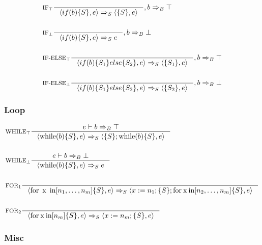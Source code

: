 \begin{align*}
&\inference[$\text{IF}_\top$]{}
                      {\Braket{if(b)\{S\},e} \Rightarrow_S \Braket{\{S\},e}}
											{,b \Rightarrow_B \top}
\\\\
&\inference[$\text{IF}_\bot$]{}
                      {\Braket{if(b)\{S\},e} \Rightarrow_S e}
											{,b \Rightarrow_B \bot}
\\\\
&\inference[$\text{IF-ELSE}_\top$]{}
                      {\Braket{if(b)\{S_1\}else\{S_2\},e} \Rightarrow_S \Braket{\{S_1\},e}}
											{,b \Rightarrow_B \top}
\\\\
&\inference[$\text{IF-ELSE}_\bot$]{}
                      {\Braket{if(b)\{S_1\}else\{S_2\},e} \Rightarrow_S \Braket{\{S_2\},e}}
											{,b \Rightarrow_B \bot}
\end{align*}
\subsubsection{Loop}
\newcommand{\Tfor}{\mathbin{\text{for}}}
\newcommand{\Tx}{\mathbin{\; \text{x} \;}}
\newcommand{\Tin}{\mathbin{\text{in}}}
\newcommand{\Twhile}{\mathbin{\text{while}}}

\begin{align*}
&\inference[$\text{WHILE}_\top$]{e \vdash b \Rightarrow_B \top}
                       {\Braket{\Twhile(b)\{S\},e} \Rightarrow_S \Braket{\{S\}; \Twhile (b)\{S\},e}}
\\\\
&\inference[$\text{WHILE}_\bot$]{e \vdash b \Rightarrow_B \bot}
                       {\Braket{\Twhile(b)\{S\},e} \Rightarrow_S e}
\\\\
&\inference[$\text{FOR}_{1}$]{}
                       {\Braket{\Tfor \Tx \Tin [n_1,\dots,n_m]\{S\},e} \Rightarrow_S \Braket{x := n_1;\{S\}; \Tfor \mathbin{\text{x}} \mathbin{\text{in}} [n_2,\dots,n_m]\{S\},e}}
\\\\
&\inference[$\text{FOR}_{2}$]{}
                       {\Braket{\Tfor \mathbin{\text{x}} \mathbin{\text{in}} [n_m]\{S\},e} \Rightarrow_S \Braket{x := n_m;\{S\},e}}
\end{align*}

\subsubsection{Misc}
\newcommand{\Tspawn}{\mathbin{\text{spawn}}}
\newcommand{\Tsend}{\mathbin{\text{send}}}
\newcommand{\Ta}{\; \mathbin{\text{a}} \;}
\newcommand{\Tm}{\; \mathbin{\text{m}} \;}
\newcommand{\Twhere}{\mathbin{\text{where}}}
\newcommand{\Ten}{\mathbin{\text{env}}}

